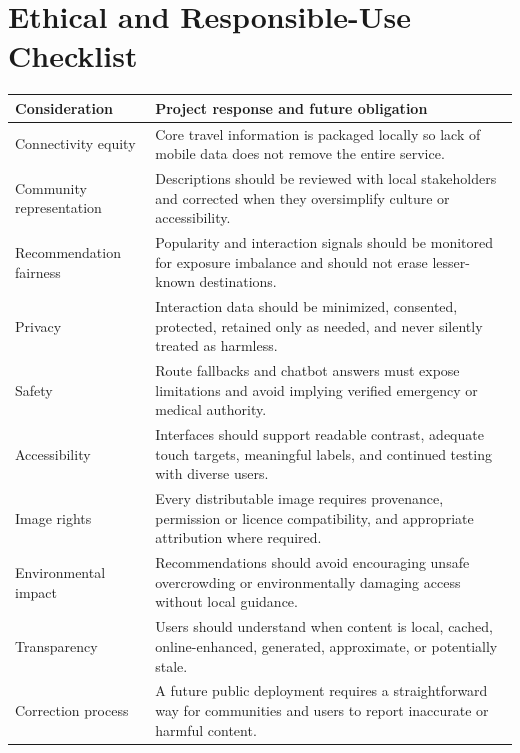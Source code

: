 \clearpage
\section{Ethical and Responsible-Use Checklist}
\begin{longtable}{p{5.0cm}p{8.8cm}}
\toprule
\textbf{Consideration} & \textbf{Project response and future obligation} \\
\midrule
Connectivity equity & Core travel information is packaged locally so lack of mobile data does not remove the entire service. \\
Community representation & Descriptions should be reviewed with local stakeholders and corrected when they oversimplify culture or accessibility. \\
Recommendation fairness & Popularity and interaction signals should be monitored for exposure imbalance and should not erase lesser-known destinations. \\
Privacy & Interaction data should be minimized, consented, protected, retained only as needed, and never silently treated as harmless. \\
Safety & Route fallbacks and chatbot answers must expose limitations and avoid implying verified emergency or medical authority. \\
Accessibility & Interfaces should support readable contrast, adequate touch targets, meaningful labels, and continued testing with diverse users. \\
Image rights & Every distributable image requires provenance, permission or licence compatibility, and appropriate attribution where required. \\
Environmental impact & Recommendations should avoid encouraging unsafe overcrowding or environmentally damaging access without local guidance. \\
Transparency & Users should understand when content is local, cached, online-enhanced, generated, approximate, or potentially stale. \\
Correction process & A future public deployment requires a straightforward way for communities and users to report inaccurate or harmful content. \\
\bottomrule
\end{longtable}

\clearpage
